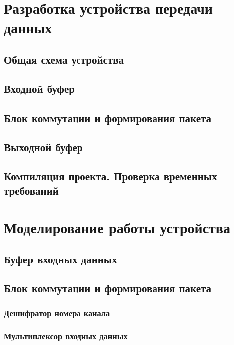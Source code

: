 \tableofcontents

\newpage

\section{Разработка устройства передачи данных}

\subsection{Общая схема устройства}

\subsection{Входной буфер}

\subsection{Блок коммутации и формирования пакета}

\subsection{Выходной буфер}

\subsection{Компиляция проекта. Проверка временных требований}

\section{Моделирование работы устройства}

\subsection{Буфер входных данных}

\subsection{Блок коммутации и формирования пакета}

\subsubsection{Дешифратор номера канала}

\subsubsection{Мультиплексор входных данных}


